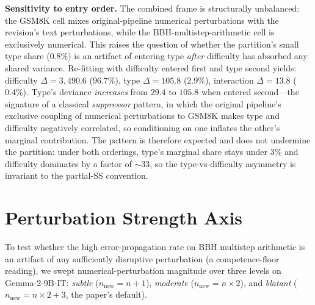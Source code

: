 \documentclass[10pt]{article} %
\begin{document}
\textbf{Sensitivity to entry order.} The combined frame is structurally unbalanced: the GSM8K cell mixes original-pipeline numerical perturbations with the revision's text perturbations, while the BBH-multistep-arithmetic cell is exclusively numerical. This raises the question of whether the partition's small type share ($0.8\%$) is an artifact of entering type \emph{after} difficulty has absorbed any shared variance. Re-fitting with difficulty entered first and type second yields: difficulty $\Delta = 3{,}490.6$ ($96.7\%$), type $\Delta = 105.8$ ($2.9\%$), interaction $\Delta = 13.8$ ($0.4\%$). Type's deviance \emph{increases} from $29.4$ to $105.8$ when entered second---the signature of a classical \emph{suppressor} pattern, in which the original pipeline's exclusive coupling of numerical perturbations to GSM8K makes type and difficulty negatively correlated, so conditioning on one inflates the other's marginal contribution. The pattern is therefore expected and does not undermine the partition: under both orderings, type's marginal share stays under $3\%$ and difficulty dominates by a factor of $\sim$33, so the type-vs-difficulty asymmetry is invariant to the partial-SS convention.


\section{Perturbation Strength Axis}
\label{app:strength_axis}

To test whether the high error-propagation rate on BBH multistep arithmetic is an artifact of any sufficiently disruptive perturbation (a competence-floor reading), we swept numerical-perturbation magnitude over three levels on Gemma-2-9B-IT: \emph{subtle} ($n_{\text{new}} = n+1$), \emph{moderate} ($n_{\text{new}} = n \times 2$), and \emph{blatant} ($n_{\text{new}} = n \times 2 + 3$, the paper's default).
\end{document}
